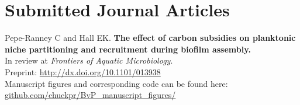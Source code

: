 \documentclass[letterpaper]{article}
\renewenvironment{itemize}{
  \begin{list}{}{
    \setlength{\leftmargin}{1.5em}
  }
}{
  \end{list}
}
\begin{document}
\section*{Submitted Journal Articles}
\begin{itemize}
\item Pepe-Ranney C and Hall EK. \textbf{The effect of carbon subsidies on
    planktonic niche partitioning and recruitment during biofilm
    assembly.}\\
    In review at \textit{Frontiers of Aquatic Microbiology}.\\
    Preprint: \href{http://dx.doi.org/10.1101/013938}
    {http://dx.doi.org/10.1101/013938}\\
    Manuscript figures and corresponding code can be found here: \\
    \href{http://www.github.com/chuckpr/BvP_manuscript_figures/}
    {github.com/chuckpr/BvP\_manuscript\_figures/}
\end{itemize}
\end{document}
